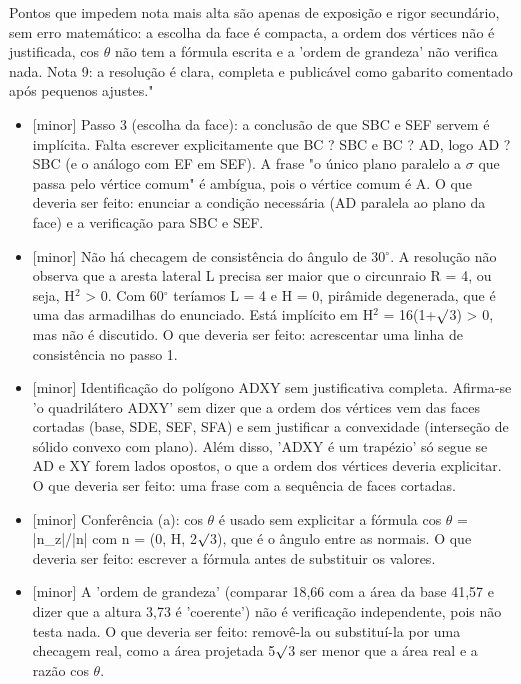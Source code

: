 \documentclass{article}%
\begin{document}
\newline%
Pontos que impedem nota mais alta são apenas de exposição e rigor secundário, sem erro matemático: a escolha da face é compacta, a ordem dos vértices não é justificada, cos $\theta$ não tem a fórmula escrita e a 'ordem de grandeza' não verifica nada. Nota 9: a resolução é clara, completa e publicável como gabarito comentado após pequenos ajustes."%
\begin{itemize}%
\item%
{[}minor{]} Passo 3 (escolha da face): a conclusão de que SBC e SEF servem é implícita. Falta escrever explicitamente que BC ? SBC e BC ? AD, logo AD ? SBC (e o análogo com EF em SEF). A frase "o único plano paralelo a $\sigma$ que passa pelo vértice comum" é ambígua, pois o vértice comum é A. O que deveria ser feito: enunciar a condição necessária (AD paralela ao plano da face) e a verificação para SBC e SEF.%
\item%
{[}minor{]} Não há checagem de consistência do ângulo de 30$^\circ$. A resolução não observa que a aresta lateral L precisa ser maior que o circunraio R = 4, ou seja, H$^2$ > 0. Com 60$^\circ$ teríamos L = 4 e H = 0, pirâmide degenerada, que é uma das armadilhas do enunciado. Está implícito em H$^2$ = 16(1+$\surd$3) > 0, mas não é discutido. O que deveria ser feito: acrescentar uma linha de consistência no passo 1.%
\item%
{[}minor{]} Identificação do polígono ADXY sem justificativa completa. Afirma{-}se 'o quadrilátero ADXY' sem dizer que a ordem dos vértices vem das faces cortadas (base, SDE, SEF, SFA) e sem justificar a convexidade (interseção de sólido convexo com plano). Além disso, 'ADXY é um trapézio' só segue se AD e XY forem lados opostos, o que a ordem dos vértices deveria explicitar. O que deveria ser feito: uma frase com a sequência de faces cortadas.%
\item%
{[}minor{]} Conferência (a): cos $\theta$ é usado sem explicitar a fórmula cos $\theta$ = |n\_z|/|n| com n = (0, H, 2$\surd$3), que é o ângulo entre as normais. O que deveria ser feito: escrever a fórmula antes de substituir os valores.%
\item%
{[}minor{]} A 'ordem de grandeza' (comparar 18,66 com a área da base 41,57 e dizer que a altura 3,73 é 'coerente') não é verificação independente, pois não testa nada. O que deveria ser feito: removê{-}la ou substituí{-}la por uma checagem real, como a área projetada 5$\surd$3 ser menor que a área real e a razão cos $\theta$.%
\end{itemize}%
\end{document}
